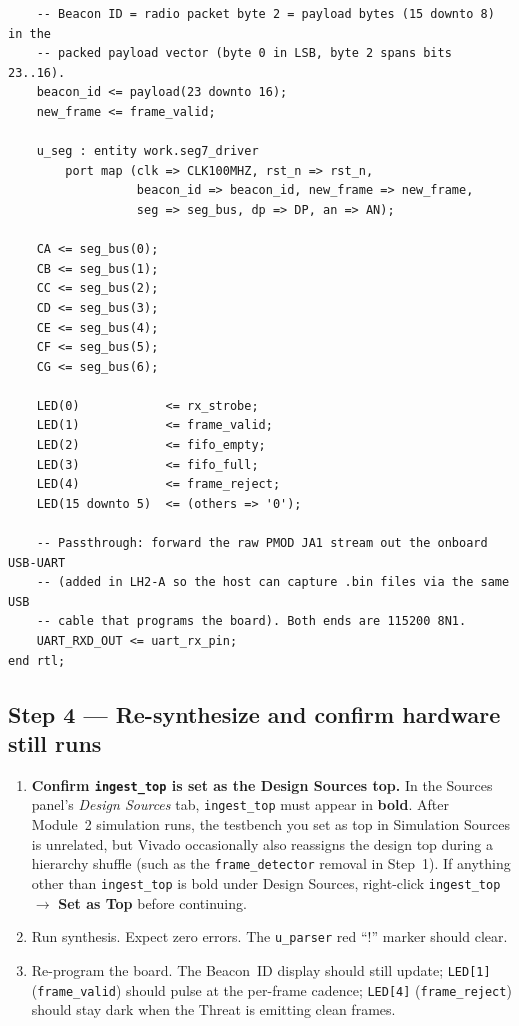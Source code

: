 \documentclass[11pt,letterpaper]{article}
\begin{document}
\begin{lstlisting}
    -- Beacon ID = radio packet byte 2 = payload bytes (15 downto 8) in the
    -- packed payload vector (byte 0 in LSB, byte 2 spans bits 23..16).
    beacon_id <= payload(23 downto 16);
    new_frame <= frame_valid;

    u_seg : entity work.seg7_driver
        port map (clk => CLK100MHZ, rst_n => rst_n,
                  beacon_id => beacon_id, new_frame => new_frame,
                  seg => seg_bus, dp => DP, an => AN);

    CA <= seg_bus(0);
    CB <= seg_bus(1);
    CC <= seg_bus(2);
    CD <= seg_bus(3);
    CE <= seg_bus(4);
    CF <= seg_bus(5);
    CG <= seg_bus(6);

    LED(0)            <= rx_strobe;
    LED(1)            <= frame_valid;
    LED(2)            <= fifo_empty;
    LED(3)            <= fifo_full;
    LED(4)            <= frame_reject;
    LED(15 downto 5)  <= (others => '0');

    -- Passthrough: forward the raw PMOD JA1 stream out the onboard USB-UART
    -- (added in LH2-A so the host can capture .bin files via the same USB
    -- cable that programs the board). Both ends are 115200 8N1.
    UART_RXD_OUT <= uart_rx_pin;
end rtl;
\end{lstlisting}

\subsection{Step 4 --- Re-synthesize and confirm hardware still runs}
\begin{enumerate}[leftmargin=2em]
	\item \textbf{Confirm \texttt{ingest\_top} is set as the Design Sources top.} In the Sources panel's \textit{Design Sources} tab, \texttt{ingest\_top} must appear in \textbf{bold}. After Module~2 simulation runs, the testbench you set as top in Simulation Sources is unrelated, but Vivado occasionally also reassigns the design top during a hierarchy shuffle (such as the \texttt{frame\_detector} removal in Step~1). If anything other than \texttt{ingest\_top} is bold under Design Sources, right-click \texttt{ingest\_top} $\to$ \textbf{Set as Top} before continuing.
	\item Run synthesis. Expect zero errors. The \texttt{u\_parser} red ``!'' marker should clear.
	\item Re-program the board. The Beacon~ID display should still update; \texttt{LED[1]} (\texttt{frame\_valid}) should pulse at the per-frame cadence; \texttt{LED[4]} (\texttt{frame\_reject}) should stay dark when the Threat is emitting clean frames.
\end{enumerate}
\end{document}
